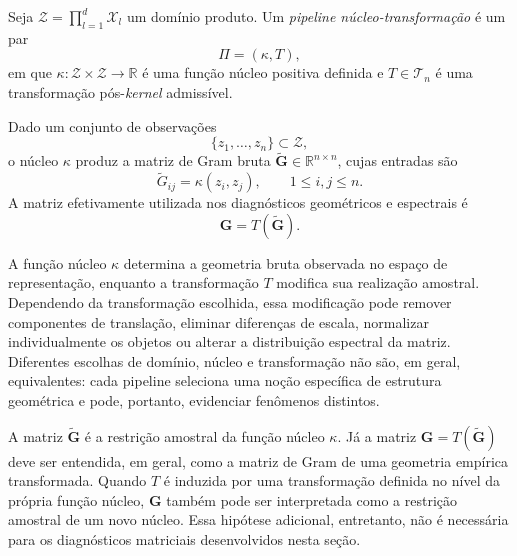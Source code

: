 \begin{definition}
\label{def:kernel_pipeline}
Seja $\mathcal{Z}=\prod_{l=1}^{d}\mathcal{X}_l$ um domínio produto. Um \emph{pipeline núcleo-transformação} é um par
\begin{equation}
    \Pi = (\kappa,T),
\end{equation}
em que $\kappa:\mathcal{Z}\times\mathcal{Z}\to\mathbb{R}$ é uma função núcleo positiva definida e $T\in\mathcal{T}_n$ é uma transformação pós-\textit{kernel} admissível.

Dado um conjunto de observações
\begin{equation*}
    \{z_1,\dots,z_n\}
    \subset\mathcal{Z},
\end{equation*}
o núcleo $\kappa$ produz a matriz de Gram bruta
$\widetilde{\mathbf{G}}\in\mathbb{R}^{n\times n}$, cujas entradas são
\begin{equation}\label{eq:raw_gram}
    \widetilde{G}_{ij} = \kappa(z_i,z_j), \qquad 1\leq i,j\leq n.
\end{equation}
A matriz efetivamente utilizada nos diagnósticos geométricos e espectrais é
\begin{equation}\label{eq:transformed_gram}
    \mathbf{G} = T(\widetilde{\mathbf{G}}).
\end{equation}
\end{definition}

A função núcleo $\kappa$ determina a geometria bruta observada no espaço de representação, enquanto a transformação $T$ modifica sua realização amostral. Dependendo da transformação escolhida, essa modificação pode remover componentes de translação, eliminar diferenças de escala, normalizar individualmente os objetos ou alterar a distribuição espectral da matriz. Diferentes escolhas de domínio, núcleo e transformação não são, em geral, equivalentes: cada pipeline seleciona uma noção específica de estrutura geométrica e pode, portanto, evidenciar fenômenos distintos.

A matriz $\widetilde{\mathbf{G}}$ é a restrição amostral da função núcleo $\kappa$. Já a matriz
$\mathbf{G}=T(\widetilde{\mathbf{G}})$ deve ser entendida, em geral, como a matriz de Gram de uma geometria empírica transformada. Quando $T$ é induzida por uma transformação definida no nível da própria função núcleo, $\mathbf{G}$ também pode ser interpretada como a restrição amostral de um novo núcleo. Essa hipótese adicional, entretanto, não é necessária para os diagnósticos matriciais desenvolvidos nesta seção.

